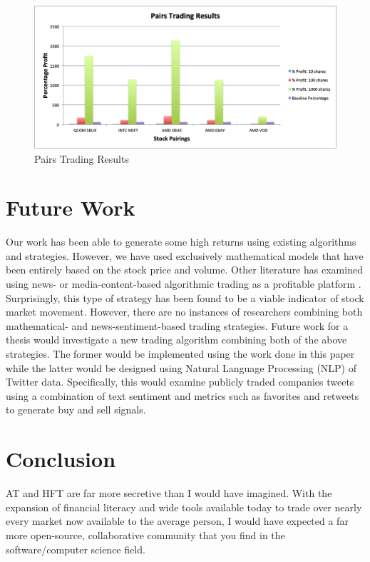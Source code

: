 \documentclass[letterpaper,11pt]{article}
\begin{document}
\begin{figure}[h]
\centering
\includegraphics[width=.9\textwidth]{pairstradingresults.png}
\caption{Pairs Trading Results \label{overflow}}
\label{PAIRSRESULTSfigure}
\end{figure}

\section{Future Work}
Our work has been able to generate some high returns using existing algorithms and strategies. However, we have used exclusively mathematical models that have been entirely based on the stock price and volume. Other literature has examined using news- or media-content-based algorithmic trading as a profitable platform \cite{Zhang2010}. Surprisingly, this type of strategy has been found to be a viable indicator of stock market movement. However, there are no instances of researchers combining both mathematical- and news-sentiment-based trading strategies. Future work for a thesis would investigate a new trading algorithm combining both of the above strategies. The former would be implemented using the work done in this paper while the latter would be designed using Natural Language Processing (NLP) of Twitter data. Specifically, this would examine  publicly traded companies tweets using a combination of text sentiment and metrics such as favorites and retweets to generate buy and sell signals.


\section{Conclusion}

AT and HFT are far more secretive than I would have imagined. With the expansion of financial literacy and wide tools available today to trade over nearly every market now available to the average person, I would have expected a far more open-source, collaborative community that you find in the software/computer science field. 
\end{document}
